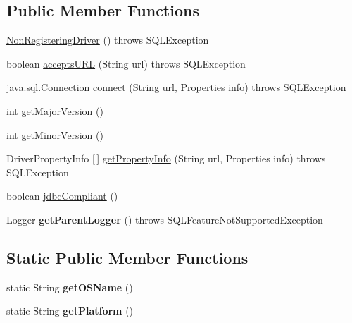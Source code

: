\subsection*{Public Member Functions}
\begin{DoxyCompactItemize}
\item 
\mbox{\hyperlink{classcom_1_1mysql_1_1cj_1_1jdbc_1_1_non_registering_driver_a43d2c5741a06d37722f12c74d34cad9c}{Non\+Registering\+Driver}} ()  throws S\+Q\+L\+Exception 
\item 
boolean \mbox{\hyperlink{classcom_1_1mysql_1_1cj_1_1jdbc_1_1_non_registering_driver_a647f9685378b944a3c5c6d9f9c47d7f1}{accepts\+U\+RL}} (String url)  throws S\+Q\+L\+Exception 
\item 
java.\+sql.\+Connection \mbox{\hyperlink{classcom_1_1mysql_1_1cj_1_1jdbc_1_1_non_registering_driver_ab3fd3d522550db032eab6c240b554e3e}{connect}} (String url, Properties info)  throws S\+Q\+L\+Exception 
\item 
int \mbox{\hyperlink{classcom_1_1mysql_1_1cj_1_1jdbc_1_1_non_registering_driver_a49801fef4e0494c6b788eab02ed7c30f}{get\+Major\+Version}} ()
\item 
int \mbox{\hyperlink{classcom_1_1mysql_1_1cj_1_1jdbc_1_1_non_registering_driver_a004f3e6c14f4cecb91e1d10cb87f873f}{get\+Minor\+Version}} ()
\item 
Driver\+Property\+Info \mbox{[}$\,$\mbox{]} \mbox{\hyperlink{classcom_1_1mysql_1_1cj_1_1jdbc_1_1_non_registering_driver_ad132531e673998633349a65c4c3eb402}{get\+Property\+Info}} (String url, Properties info)  throws S\+Q\+L\+Exception 
\item 
boolean \mbox{\hyperlink{classcom_1_1mysql_1_1cj_1_1jdbc_1_1_non_registering_driver_a7957fc641b984cf8d56938949be1069d}{jdbc\+Compliant}} ()
\item 
\mbox{\label{classcom_1_1mysql_1_1cj_1_1jdbc_1_1_non_registering_driver_a458cfbaed5ad475322ddca7ff3973928}} 
Logger {\bfseries get\+Parent\+Logger} ()  throws S\+Q\+L\+Feature\+Not\+Supported\+Exception 
\end{DoxyCompactItemize}
\subsection*{Static Public Member Functions}
\begin{DoxyCompactItemize}
\item 
\mbox{\label{classcom_1_1mysql_1_1cj_1_1jdbc_1_1_non_registering_driver_a51da4d6e28d7a51a1c10daddf2376f94}} 
static String {\bfseries get\+O\+S\+Name} ()
\item 
\mbox{\label{classcom_1_1mysql_1_1cj_1_1jdbc_1_1_non_registering_driver_add52c29486e82fccba3a92b79a6b44de}} 
static String {\bfseries get\+Platform} ()
\end{DoxyCompactItemize}
